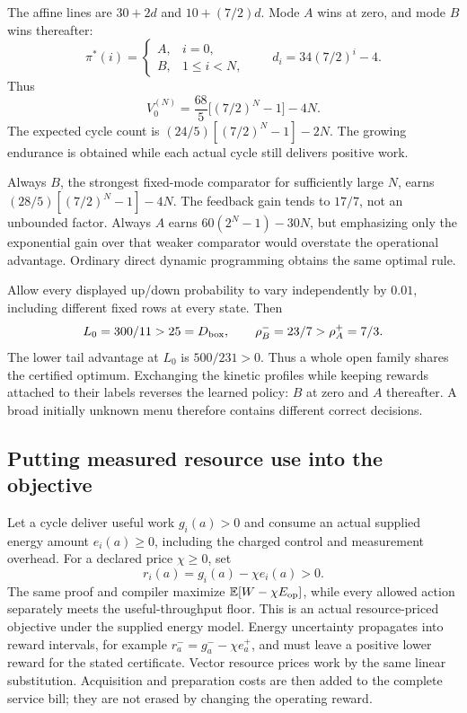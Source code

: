 \documentclass[10pt,a4paper]{article}
\newcommand{\E}{\mathbb E}\newcommand{\Pp}{\mathbb P}
\begin{document}
The affine lines are $30+2d$ and $10+(7/2)d$. Mode $A$ wins at zero, and mode $B$ wins thereafter:
\begin{equation}
\pi^*(i)=\begin{cases}A,&i=0,\\B,&1\le i<N,\end{cases}
\qquad d_i=34(7/2)^i-4.
\end{equation}
Thus
\begin{equation}
\boxed{V_0^{(N)}=\frac{68}{5}\big[(7/2)^N-1\big]-4N.}
\label{eq:examplevalue}
\end{equation}
The expected cycle count is $(24/5)[(7/2)^N-1]-2N$. The growing endurance is obtained while each actual cycle still delivers positive work.

Always $B$, the strongest fixed-mode comparator for sufficiently large $N$, earns
$(28/5)[(7/2)^N-1]-4N$. The feedback gain tends to $17/7$, not an unbounded factor. Always $A$ earns $60(2^N-1)-30N$, but emphasizing only the exponential gain over that weaker comparator would overstate the operational advantage. Ordinary direct dynamic programming obtains the same optimal rule.

Allow every displayed up/down probability to vary independently by $0.01$, including different fixed rows at every state. Then
\[
L_0=300/11>25=D_{\rm box},\qquad
\rho_B^-=23/7>\rho_A^+=7/3.
\]
The lower tail advantage at $L_0$ is $500/231>0$. Thus a whole open family shares the certified optimum. Exchanging the kinetic profiles while keeping rewards attached to their labels reverses the learned policy: $B$ at zero and $A$ thereafter. A broad initially unknown menu therefore contains different correct decisions.

\subsection{Putting measured resource use into the objective}

Let a cycle deliver useful work $g_i(a)>0$ and consume an actual supplied energy amount $e_i(a)\ge0$, including the charged control and measurement overhead. For a declared price $\chi\ge0$, set
\[
r_i(a)=g_i(a)-\chi e_i(a)>0.
\]
The same proof and compiler maximize $\E[W-\chi E_{\rm op}]$, while every allowed action separately meets the useful-throughput floor. This is an actual resource-priced objective under the supplied energy model. Energy uncertainty propagates into reward intervals, for example $r_a^-=g_a^- -\chi e_a^+$, and must leave a positive lower reward for the stated certificate. Vector resource prices work by the same linear substitution. Acquisition and preparation costs are then added to the complete service bill; they are not erased by changing the operating reward.
\end{document}
